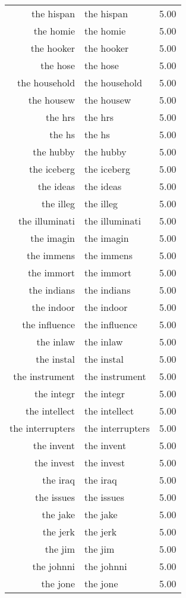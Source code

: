 \begin{table}[ht]
\begin{tabular}{rlr}
  the hispan & the hispan & 5.00 \\ 
  the homie & the homie & 5.00 \\ 
  the hooker & the hooker & 5.00 \\ 
  the hose & the hose & 5.00 \\ 
  the household & the household & 5.00 \\ 
  the housew & the housew & 5.00 \\ 
  the hrs & the hrs & 5.00 \\ 
  the hs & the hs & 5.00 \\ 
  the hubby & the hubby & 5.00 \\ 
  the iceberg & the iceberg & 5.00 \\ 
  the ideas & the ideas & 5.00 \\ 
  the illeg & the illeg & 5.00 \\ 
  the illuminati & the illuminati & 5.00 \\ 
  the imagin & the imagin & 5.00 \\ 
  the immens & the immens & 5.00 \\ 
  the immort & the immort & 5.00 \\ 
  the indians & the indians & 5.00 \\ 
  the indoor & the indoor & 5.00 \\ 
  the influence & the influence & 5.00 \\ 
  the inlaw & the inlaw & 5.00 \\ 
  the instal & the instal & 5.00 \\ 
  the instrument & the instrument & 5.00 \\ 
  the integr & the integr & 5.00 \\ 
  the intellect & the intellect & 5.00 \\ 
  the interrupters & the interrupters & 5.00 \\ 
  the invent & the invent & 5.00 \\ 
  the invest & the invest & 5.00 \\ 
  the iraq & the iraq & 5.00 \\ 
  the issues & the issues & 5.00 \\ 
  the jake & the jake & 5.00 \\ 
  the jerk & the jerk & 5.00 \\ 
  the jim & the jim & 5.00 \\ 
  the johnni & the johnni & 5.00 \\ 
  the jone & the jone & 5.00 \\ 

\end{tabular}
\end{table}
